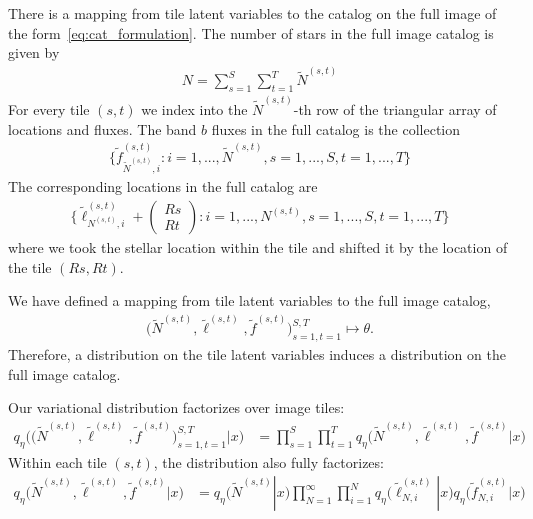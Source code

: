 There is a mapping from tile latent variables to the catalog on the full image of the form~\eqref{eq:cat_formulation}. 
The number of stars
in the full image catalog is given by 
\begin{align}
    N = \sum_{s=1}^{S}\sum_{t=1}^T \tilde N^{(s, t)}
\end{align}
For every tile $(s,t)$ we index into the $\tilde N^{(s,t)}$-th
row of the triangular array of locations and fluxes. 
The band $b$ fluxes in the full catalog 
is the collection
\begin{align}
    \Big\{\tilde f_{\tilde N^{(s, t)}, i}^{(s, t)} : i = 1, ..., \tilde N^{(s, t)}, s = 1, ..., S, t = 1, ..., T \Big\}
\end{align}
The corresponding locations in the full catalog are 
\begin{align}
    \Big\{\tilde \ell_{N^{(s, t)}, i}^{(s, t)} + 
    \begin{pmatrix}
    Rs \\ Rt
    \end{pmatrix} 
    : i = 1, ..., N^{(s, t)}, s = 1, ..., S, t = 1, ..., T\Big\}
\end{align}
where we took the stellar location within the tile and shifted it by the location of the tile $(Rs, Rt)$. 

We have defined a mapping from tile latent variables to the full image catalog, 
\begin{align}
 \big(\tilde N^{(s, t)}, \tilde \ell^{(s, t)}, \tilde f^{(s, t)}\big)_{s=1, t = 1}^{S, T}
\mapsto \theta.    
\label{eq:patch_to_full_map}
\end{align}
Therefore, a distribution on the tile latent variables induces a distribution on the full image catalog. 

Our variational distribution factorizes over image tiles:
\begin{align}
    q_\eta\big( \big(\tilde N^{(s, t)}, \tilde \ell^{(s, t)}, \tilde f^{(s, t)}\big)_{s=1, t = 1}^{S, T}|x\big) 
    &=
    \prod_{s = 1}^S \prod_{t=1}^T q_\eta\big(\tilde N^{(s, t)}, \tilde \ell^{(s, t)}, \tilde f^{(s, t)} | x\big)
    \label{eq:factorize_patches}
\end{align}
Within each tile $(s,t)$, the distribution also fully factorizes: 
\begin{align}
    q_\eta\big(\tilde N^{(s, t)}, \tilde \ell^{(s, t)}, \tilde f^{(s, t)} | x\big)
    &= 
    q_\eta\big(\tilde N^{(s, t)} | x\big)
    \prod_{N = 1}^\infty \prod_{i = 1}^N 
    q_\eta\big(\tilde \ell_{N,i}^{(s, t)} | x\big)
    q_\eta\big(\tilde f_{N,i}^{(s, t)} | x\big)
    \label{eq:factorize_within_patch}
\end{align}

